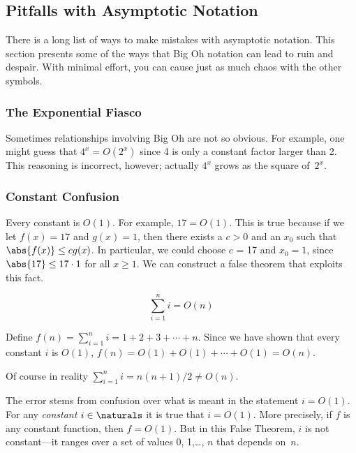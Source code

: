 \subsection{Pitfalls with Asymptotic Notation}

There is a long list of ways to make mistakes with asymptotic
notation.  This section presents some of the ways that Big Oh notation
can lead to ruin and despair.  With minimal effort, you can cause just
as much chaos with the other symbols.

\subsubsection{The Exponential Fiasco}

Sometimes relationships involving Big Oh are not so obvious.  For
example, one might guess that $4^x = O(2^x)$ since 4 is only a
constant factor larger than 2.  This reasoning is incorrect, however;
actually $4^x$ grows as the square
of~$2^x$.

\subsubsection{Constant Confusion}

Every constant is $O(1)$.  For example, $17 = O(1)$.  This is true because
if we let $f(x) = 17$ and $g(x) = 1$, then there exists a $c > 0$ and an
$x_0$ such that $\abs{f(x)} \leq c g(x)$.  In particular, we could choose
$c$ = 17 and $x_0 = 1$, since $\abs{17} \leq 17 \cdot 1$ for all $x \geq
1$.  We can construct a false theorem that exploits this fact.

\begin{falsethm}
\[
\sum_{i=1}^n i = O(n)
\]
\end{falsethm}

\begin{bogusproof}
Define $f(n) = \sum_{i=1}^n i = 1 + 2 + 3 + \cdots + n$.  Since we
have shown that every constant $i$ is $O(1)$, $f(n) = O(1) + O(1) +
\cdots + O(1) = O(n)$.
\end{bogusproof}

Of course in reality $\sum_{i=1}^n i = n(n+1)/2 \neq O(n)$.

The error stems from confusion over what is meant in the statement $i
= O(1)$.  For any \emph{constant} $i\in \naturals$ it is true that $i
= O(1)$.  More precisely, if $f$ is any constant function, then $f =
O(1)$.  But in this False Theorem, $i$ is not constant---it ranges
over a set of values 0, 1,\dots, $n$ that depends on~$n$.

